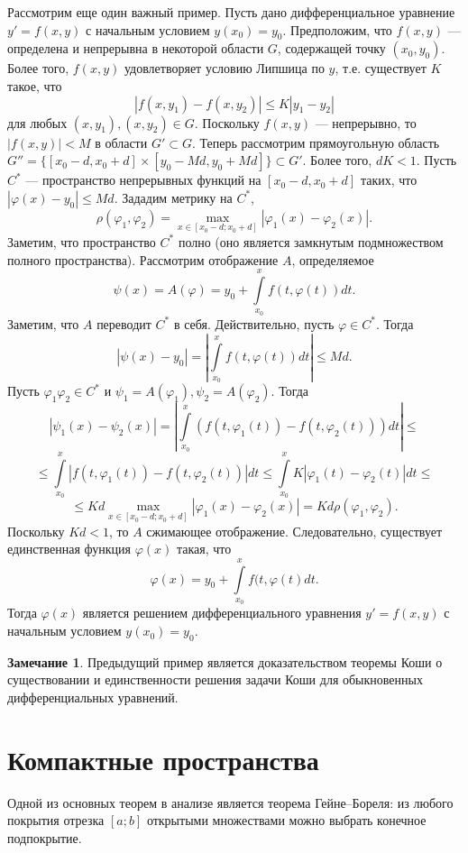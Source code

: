 \documentclass[12pt, titlepage, oneside]{amsbook}
\theoremstyle{definition}
\newtheorem{remark}[theorem]{Замечание}
\theoremstyle{remark}
\begin{document}
Рассмотрим еще один важный пример. Пусть дано дифференциальное уравнение $y'=f(x,y)$ с начальным условием $y(x_0)=y_0$. Предположим, что $f(x,y)$ --- определена и непрерывна в некоторой области $G$, содержащей точку $(x_0,y_0)$. Более того, $f(x,y)$ удовлетворяет условию Липшица по $y$, т.е. существует $K$ такое, что $$|f(x,y_1)-f(x,y_2)|\leq K|y_1-y_2|$$ для любых $(x,y_1), (x,y_2)\in G$. Поскольку $f(x,y)$ --- непрерывно, то $|f(x,y)|<M$ в области $G'\subset G$. Теперь рассмотрим прямоугольную область $G''=\{[x_0-d,x_0+d]\times[y_0-Md,y_0+Md]\}\subset G'$. Более того, $dK<1$. Пусть $C^*$ --- пространство непрерывных функций на $[x_0-d,x_0+d]$ таких, что $|\varphi(x)-y_0|\leq Md$. Зададим метрику на $C^*$, $$\rho(\varphi_1,\varphi_2)=\max\limits_{x\in[x_0-d;x_0+d]}|\varphi_1(x)-\varphi_2(x)|.$$ Заметим, что пространство $C^*$ полно (оно является замкнутым подмножеством полного пространства).
Рассмотрим отображение $A$, определяемое $$\psi(x)=A(\varphi)=y_0+\int\limits_{x_0}^x f(t,\varphi(t))dt.$$ Заметим, что $A$ переводит $C^*$ в себя. Действительно, пусть $\varphi\in C^*$. Тогда $$|\psi(x)-y_0|=\left|\int\limits_{x_0}^x f(t,\varphi(t))dt\right|\leq M d.$$ Пусть $\varphi_1 \varphi_2\in C^*$ и $\psi_1=A(\varphi_1), \psi_2=A(\varphi_2)$. Тогда $$|\psi_1(x)-\psi_2(x)|=\left|\int\limits_{x_0}^x (f(t,\varphi_1(t))-f(t,\varphi_2(t)))dt\right|\leq$$ $$\leq\int\limits_{x_0}^x |f(t,\varphi_1(t))-f(t,\varphi_2(t))|dt\leq\int\limits_{x_0}^x K|\varphi_1(t)-\varphi_2(t)|dt\leq$$ $$\leq Kd\max\limits_{x\in[x_0-d;x_0+d]}|\varphi_1(x)-\varphi_2(x)|=Kd\rho(\varphi_1,\varphi_2).$$ Поскольку $Kd<1$, то $A$ сжимающее отображение. Следовательно, существует единственная функция $\varphi(x)$ такая, что $$\varphi(x)=y_0+\int\limits_{x_0}^x f(t,\varphi(t)dt.$$ Тогда $\varphi(x)$ является решением дифференциального уравнения $y'=f(x,y)$ с начальным условием $y(x_0)=y_0$.

\begin{remark}
Предыдущий пример является доказательством теоремы Коши о существовании и единственности решения задачи Коши для обыкновенных дифференциальных уравнений.
\end{remark}

\section{Компактные пространства}

Одной из основных теорем в анализе является теорема Гейне--Бореля: из любого покрытия отрезка $[a;b]$ открытыми множествами можно выбрать конечное подпокрытие.
\end{document}
